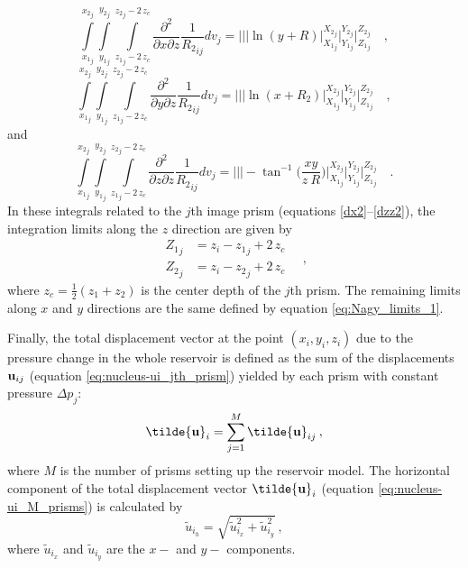 \documentclass[journal abbreviation, manuscript]{copernicus}
\begin{document}
\begin{equation}
\int\limits_{{x_{1}}_{j}}^{{x_{2}}_{j}} \int\limits_{{y_{1}}_{j}}^{{y_{2}}_{j}} \int\limits_{{z_{1}}_{j} - 2 \, z_c}^{{z_{2}}_{j} - 2 \, z_c}
\frac{\partial^{2}  }{\partial x \partial z} {\frac{1}{{R_2}_{ij}}}  dv_j = \Bigg|\Bigg|\Bigg| 
\ln(y + R)
\Bigg|_{{X_1}_{j}}^{{X_2}_{j}} \Bigg|_{{Y_1}_{j}}^{{Y_2}_{j}} \Bigg|_{{Z_1}_{j}}^{{Z_2}_{j}} \quad ,
\label{dxz2}
\end{equation}
\begin{equation}
\int\limits_{{x_{1}}_{j}}^{{x_{2}}_{j}} \int\limits_{{y_{1}}_{j}}^{{y_{2}}_{j}} \int\limits_{{z_{1}}_{j} - 2 \, z_c}^{{z_{2}}_{j} - 2 \, z_c}
\frac{\partial^{2}  }{\partial y \partial z} {\frac{1}{{R_2}_{ij}}}  dv_j =
\Bigg|\Bigg|\Bigg|
\ln(x + {R_2})
\Bigg|_{{X_1}_{j}}^{{X_2}_{j}} \Bigg|_{{Y_1}_{j}}^{{Y_2}_{j}} \Bigg|_{{Z_1}_{j}}^{{Z_2}_{j}} \quad ,
\label{dyz2}
\end{equation}
and
\begin{equation}
\int\limits_{{x_{1}}_{j}}^{{x_{2}}_{j}} \int\limits_{{y_{1}}_{j}}^{{y_{2}}_{j}} \int\limits_{{z_{1}}_{j} - 2 \, z_c}^{{z_{2}}_{j} - 2 \, z_c}
\frac{\partial^{2}  }{\partial z \partial z} {\frac{1}{{R_2}_{ij}}}  dv_j =
\Bigg|\Bigg|\Bigg|
-   \tan^{-1} \Bigg( \frac{xy}{z \: R} \Bigg)
\Bigg|_{{X_1}_{j}}^{{X_2}_{j}} \Bigg|_{{Y_1}_{j}}^{{Y_2}_{j}} \Bigg|_{{Z_1}_{j}}^{{Z_2}_{j}} \quad .
\label{dzz2}
\end{equation}
In these integrals related to the $j$th image prism 
(equations \ref{dx2}--\ref{dzz2}), the integration limits along the $z$ direction
are given by
\begin{equation}
\begin{array}{ll}
{Z_1}_{j} &= z_i - {z_1}_{j} + 2 \, z_c \\
{Z_2}_{j} &= z_i - {z_2}_{j} + 2 \, z_c
\end{array} \quad ,
\label{eq:Nagy_limits_2}
\end{equation}
where $z_c = \frac{1}{2}(z_1 + z_2)$ is the center depth of the $j$th prism. 
The remaining limits along $x$ and $y$ directions are the same defined by equation 
\ref{eq:Nagy_limits_1}.

Finally, the total displacement vector at the point $(x_i, y_i, z_i)$ due to the
pressure change in the whole reservoir is defined as the sum of the displacements 
${\bf{u}}_{ij}$ (equation \ref{eq:nucleus-ui_jth_prism}) yielded by each prism 
with constant pressure $\Delta p_{j}$:
\begin{equation}
{\bf{\tilde{u}}}_{i} = \sum_{j=1}^{M} {\bf{\tilde{u}}}_{ij} \: ,
\label{eq:nucleus-ui_M_prisms}
\end{equation}
where $M$ is the number of prisms setting up the reservoir model.
The horizontal component of the total displacement vector ${\bf{\tilde{u}}}_{i}$ 
(equation \ref{eq:nucleus-ui_M_prisms}) is calculated by 
\begin{equation}
{\tilde{u}}_{{i}_h} = \sqrt{ {\tilde{u}}_{{i}_x}^{2}  +  {\tilde{u}}_{{i}_y}^{2} } 
\: ,
\label{eq:horizontal_displacement}
\end{equation}
where ${\tilde{u}}_{{i}_x}$ and ${\tilde{u}}_{{i}_y}$ are the $x-$ and $y-$ components.
\end{document}
